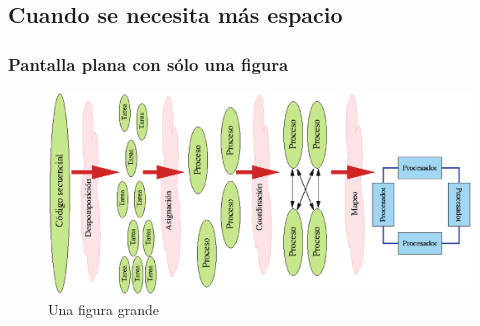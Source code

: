 \documentclass{beamer}
\begin{document}
\subsection{Cuando se necesita más espacio}
\begin{frame}[plain]
    \frametitle{Pantalla plana con sólo una figura}
    \begin{figure}
        \includegraphics[scale=0.3]{figuras/figura01.eps}
        \caption{Una figura grande}
    \end{figure}
\end{frame}
\end{document}
